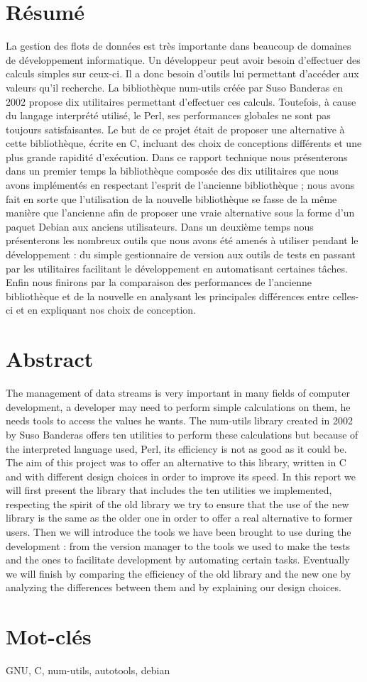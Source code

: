 \section*{R\'esum\'e}

La gestion des flots de donn\'ees est tr\`es importante dans beaucoup de domaines de d\'eveloppement informatique. Un d\'eveloppeur peut avoir besoin 
d'effectuer des calculs simples sur ceux-ci. Il a donc besoin d'outils lui permettant d'acc\'eder aux valeurs qu'il recherche. La biblioth\`eque num-utils
 cr\'e\'ee par Suso Banderas en 2002 propose dix utilitaires permettant d'effectuer ces calculs. Toutefois, \`a cause du langage interpr\'et\'e utilis\'e, 
le Perl, ses performances globales ne sont pas toujours satisfaisantes. Le but de ce projet \'etait de proposer une alternative \`a cette biblioth\`eque, 
\'ecrite en C, incluant des choix de conceptions diff\'erents et une plus grande rapidit\'e d'ex\'ecution. Dans ce rapport technique nous pr\'esenterons dans un premier temps 
la biblioth\`eque compos\'ee des dix utilitaires que nous avons impl\'ement\'es en respectant l'esprit de l'ancienne biblioth\`eque ; nous avons fait en sorte que
 l'utilisation de la nouvelle biblioth\`eque se fasse de la m\^eme mani\`ere que l'ancienne afin de proposer une vraie alternative sous la forme d'un paquet
 Debian aux anciens utilisateurs. Dans un deuxi\`eme temps nous pr\'esenterons les nombreux outils que nous avons \'et\'e amen\'es \`a utiliser pendant le 
d\'eveloppement : du simple gestionnaire de version aux outils de tests en passant par les utilitaires facilitant le d\'eveloppement en automatisant certaines t\^aches.
 Enfin nous finirons par la comparaison des performances de l'ancienne biblioth\`eque et de la nouvelle en analysant les principales diff\'erences entre celles-ci et en expliquant nos choix de conception.

\section*{Abstract}

The management of data streams is very important in many fields of computer development, a developer may need to perform simple calculations on them, he needs tools
 to access the values he wants. The num-utils library created in 2002 by Suso Banderas offers ten utilities to perform these calculations but because of the
 interpreted language used, Perl, its efficiency is not as good as it could be. The aim of this project was to offer an alternative to this library, written in
 C and with different design choices in order to improve its speed. In this report we will first present  the library that includes the ten utilities we implemented,
 respecting the spirit of the old library we try to ensure that the use of the new library is the same as the older one in order to offer a real alternative to former
 users. Then we will introduce the tools we have been brought to use during the development : from the version manager to the tools we used to make the tests and the
 ones to facilitate development by automating certain tasks. Eventually we will finish by comparing the efficiency of the old library and the new one by analyzing the
 differences between them and by explaining our design choices.

\section*{Mot-cl\'es}

GNU, C, num-utils, autotools, debian
